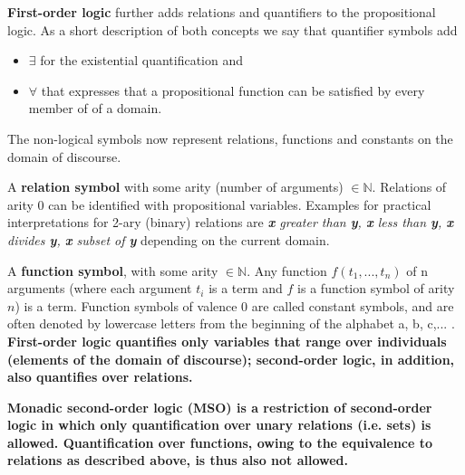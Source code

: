 \documentclass[a4paper, 12pt, bibliography=totoc]{scrartcl}
\begin{document}
\textbf{First-order logic} further adds relations and quantifiers to the propositional logic.
As a short description of both concepts we say that
quantifier symbols add
\begin{itemize}
	\item $\exists$ for the existential quantification and
	\item $\forall$ that expresses that a propositional function can be satisfied by every member of of a domain.
\end{itemize}
The non-logical symbols now represent relations, functions and constants on the domain of discourse. 

A \textbf{relation symbol} with some arity (number of arguments) $\in \mathbb{N}$.
Relations of arity 0 can be identified with propositional variables.
Examples for practical interpretations for 2-ary (binary) relations are
\textit{\textbf{x} greater than \textbf{y}, \textbf{x} less than \textbf{y}, \textbf{x} divides \textbf{y}, \textbf{x} subset of \textbf{y}} depending on the current domain.


A \textbf{function symbol}, with some arity $\in \mathbb{N}$. Any function $f(t_{1},...,t_{n})$ of n arguments (where each argument $t_{i}$ is a term and $f$ is a function symbol of arity $n$) is a term. 
Function symbols of valence 0 are called constant symbols, and are often denoted by lowercase letters from the beginning of the alphabet a, b, c,... . \\


\textbf{First-order logic quantifies only variables that range over individuals (elements of the domain of discourse); second-order logic, in addition, also quantifies over relations.}

\textbf{Monadic second-order logic (MSO) is a restriction of second-order logic in which only quantification over unary relations (i.e. sets) is allowed. Quantification over functions, owing to the equivalence to relations as described above, is thus also not allowed.}
\end{document}
